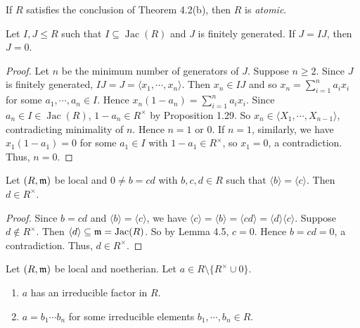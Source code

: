 \begin{definition}
    If $R$ satisfies the conclusion of Theorem 4.2(b), then $R$ is \emph {atomic}.
\end{definition}

\begin{lemma}
    Let $I,J \leq R$ such that $I \subseteq \operatorname{Jac}(R)$ and $J$ is finitely generated. If $J = IJ$, then $J = 0$.
\end{lemma}

\begin{proof}
    Let $n$ be the minimum number of generators of $J$. Suppose $n \geq 2$. Since $J$ is finitely generated, $IJ = J = \langle x_1,\cdots,x_n \rangle$. Then $x_n \in IJ$ and so $x_n = \sum_{i=1}^{n}a_ix_i$ for some $a_1,\cdots,a_n \in I$. Hence $x_n(1-a_n) = \sum_{i=1}^{n}a_ix_i$. Since $a_n \in I \in \operatorname{Jac}(R)$, $1-a_n \in R^{\times}$ by Proposition 1.29. So $x_n \in \langle X_1,\cdots,X_{n-1} \rangle$, contradicting minimality of $n$. Hence $n = 1$ or $0$. If $n = 1$, similarly, we have $x_1(1-a_1) = 0$ for some $a_1 \in I$ with $1-a_1 \in R^{\times}$, so $x_1 = 0$, a contradiction. Thus, $n = 0$.
\end{proof}

\begin{lemma}
    Let $(R,\mathfrak{m})$ be local and $0 \neq b = cd$ with $b,c,d \in R$ such that $\langle b \rangle = \langle c \rangle$. Then $d \in R^{\times}$.
\end{lemma}

\begin{proof}
    Since $b = cd$ and $\langle b \rangle = \langle c \rangle$, we have $\langle c \rangle = \langle b \rangle = \langle cd \rangle = \langle d \rangle \langle c \rangle$. Suppose $d \not \in R^{\times}$. Then $\langle d \rangle \subseteq \mathfrak{m} = \operatorname{Jac}(R)$. So by Lemma 4.5, $c = 0$. Hence $b = cd = 0$, a contradiction. Thus, $d \in R^{\times}$.
\end{proof}

\begin{theorem}
    Let $(R,\mathfrak{m})$ be local and noetherian. Let $a \in R \setminus \{R^{\times} \cup 0\}$. 
    \begin{enumerate}
        \item $a$ has an irreducible factor in $R$.
        \item $a = b_1 \cdots b_n$ for some irreducible elements $b_1,\cdots,b_n \in R$.
    \end{enumerate}
\end{theorem}

